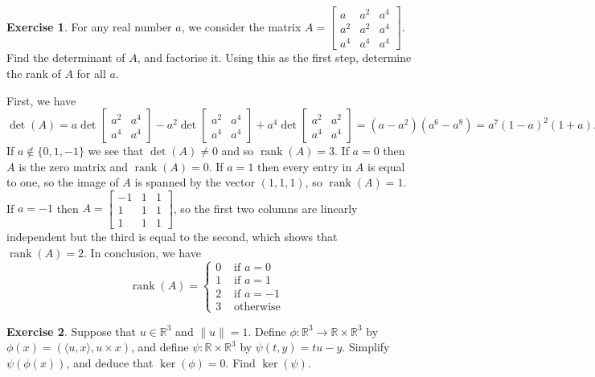 \documentclass[a4paper]{amsart}
\newcommand{\R}         {{\mathbb{R}}}
\newcommand{\bpm}       {\left[\begin{matrix}}
\newcommand{\epm}       {\end{matrix}\right]}
\newcommand{\tm}        {\times}
\newcommand{\ip}[1]     {\langle #1\rangle}
\newcommand{\xra}       {\xrightarrow}
\newcommand{\rank}      {\operatorname{rank}}
\renewcommand{\:}{\colon}
\theoremstyle{definition}
\newtheorem{exercise}{Exercise}
\newenvironment{solution}{{\noindent \bf Solution:}}{}
\begin{document}
\begin{exercise}
 For any real number $a$, we consider the matrix
 $A=\bpm a & a^2 & a^4 \\ a^2 & a^2 & a^4 \\ a^4 & a^4 & a^4 \epm$.
 Find the determinant of $A$, and factorise it.  Using this
 as the first step, determine the rank of $A$ for all $a$.
\end{exercise}
\begin{solution}
 First, we have 
 \[ \det(A) =   a   \det\bpm a^2&a^4 \\ a^4&a^4 \epm 
              - a^2 \det\bpm a^2&a^4 \\ a^4&a^4 \epm 
              + a^4 \det\bpm a^2&a^2 \\ a^4&a^4 \epm =
    (a-a^2)(a^6-a^8) = a^7(1-a)^2(1+a).
 \]
 If $a\not\in\{0,1,-1\}$ we see that $\det(A)\neq 0$ and so
 $\rank(A)=3$.  If $a=0$ then $A$ is the zero matrix and
 $\rank(A)=0$.  If $a=1$ then every entry in $A$ is equal to
 one, so the image of $A$ is spanned by the vector
 $(1,1,1)$, so $\rank(A)=1$.  If $a=-1$ then
 $A=\bpm -1&1&1\\1&1&1\\1&1&1\epm$, so the first two columns
 are linearly independent but the third is equal to the
 second, which shows that $\rank(A)=2$.  In conclusion, we
 have
 \[ \rank(A) = \begin{cases}
                0 & \text{ if } a=0 \\
                1 & \text{ if } a=1 \\
                2 & \text{ if } a=-1 \\
                3 & \text{ otherwise }
               \end{cases}
 \]
\end{solution}


\begin{exercise}
 Suppose that $u\in\R^3$ and $\|u\|=1$.  Define
 $\phi\:\R^3\xra{}\R\tm\R^3$ by $\phi(x)=(\ip{u,x},u\tm x)$,
 and define $\psi\:\R\tm\R^3$ by $\psi(t,y)=tu-y$.  Simplify
 $\psi(\phi(x))$, and deduce that $\ker(\phi)=0$.  Find
 $\ker(\psi)$.  
\end{exercise}
\begin{solution}
 
\end{solution}
\end{document}
